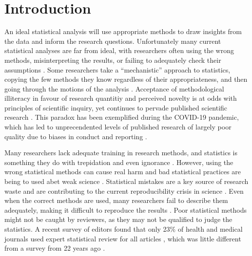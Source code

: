 \documentclass[12pt]{article}
\begin{document}
\newpage
{} %

\hypertarget{introduction}{%
\section{Introduction}\label{introduction}}

An ideal statistical analysis will use appropriate methods to draw
insights from the data and inform the research questions. Unfortunately
many current statistical analyses are far from ideal, with 
researchers often using the wrong methods, misinterpreting the results, or
failing to adequately check their assumptions \citep{2008, Leek2017}.
Some researchers take a ``mechanistic'' approach to statistics, copying
the few methods they know regardless of their appropriateness, and then
going through the motions of the analysis \citep{Stark2018}. Acceptance of methodological illiteracy in favour of 
research quantitiy and perceived novelty is at odds
with principles of scientific inquiry, yet continues to pervade published scientific research \citep{VanCalster2021}. 
This paradox has been exemplified during the COVID-19 pandemic, which has led to unprecendented levels of published research of largely 
poor quality due to biases in conduct and reporting \citep{Glasziou2020,Wynants2020}.

Many researchers lack adequate training in research methods, and
statistics is something they do with trepidation and even ignorance
\citep{Altman1994, King2019}. However, using the wrong statistical
methods can cause real harm \citep{Altman1994, Brown2018} and bad
statistical practices are being to used abet weak science
\citep{Stark2018}. Statistical mistakes are a key source of research waste and are contributing to 
the current reproducibility crisis in
science \citep{Allison2016}. Even when the correct methods are used,
many researchers fail to describe them adequately, making it difficult
to reproduce the results \citep{Ernst2017, Zhou2018}. Poor statistical
methods might not be caught by reviewers, as they may not be qualified
to judge the statistics. A recent survey of editors found that only 23\%
of health and medical journals used expert statistical review for all
articles \citep{Hardwicke2020}, which was little different from a survey
from 22 years ago \citep{Goodman1998}.
\end{document}
